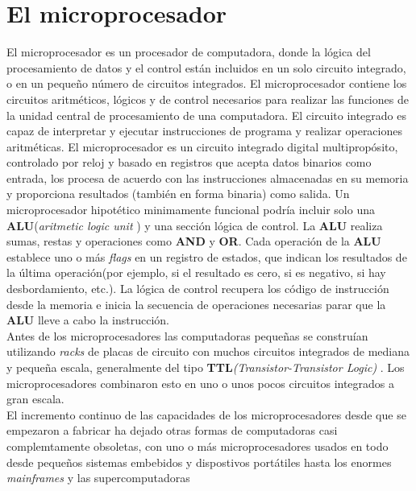 \chapter{El microprocesador}\label{chapter:microprocesador}


El microprocesador es un procesador de computadora, donde la lógica del procesamiento de datos y el control
están incluidos en un solo circuito integrado, o en un pequeño número de circuitos integrados.
El microprocesador contiene los circuitos aritméticos, lógicos y de control necesarios para realizar 
las funciones de la unidad central de procesamiento  de una computadora. El circuito integrado es capaz de interpretar y 
ejecutar instrucciones de programa y realizar operaciones aritméticas. 
El microprocesador es un circuito integrado digital multipropósito, controlado por reloj y basado en registros que 
acepta datos binarios como entrada, los procesa de acuerdo con las instrucciones almacenadas en su memoria y proporciona 
resultados (también en forma binaria) como salida. Un microprocesador hipotético minimamente funcional podría incluir
solo una \textbf{ALU}(\emph{aritmetic logic unit }) y una sección lógica de control. La \textbf{ALU} realiza sumas, restas 
y operaciones como \textbf{AND} y \textbf{OR}. Cada operación de la \textbf{ALU} establece uno o más \emph{flags} en un registro 
de estados, que indican los resultados de la última operación(por ejemplo, si el resultado es cero, si es negativo, si 
hay desbordamiento, etc.). La lógica de control recupera los código de instrucción desde la memoria e inicia la secuencia de
operaciones necesarias parar que la \textbf{ALU} lleve a cabo la instrucción.
\\ Antes de los microprocesadores las computadoras pequeñas se construían utilizando  \emph{racks} de placas de circuito con 
muchos circuitos integrados de mediana y pequeña escala, generalmente del tipo \textbf{TTL}\emph{(Transistor-Transistor Logic)} 
. Los microprocesadores combinaron esto en uno o unos pocos circuitos integrados a gran escala.\\
El incremento continuo de las capacidades de los microprocesadores desde  que 
se empezaron a fabricar ha dejado otras formas de computadoras casi complemtamente
obsoletas, con uno o más microprocesadores usados en todo desde pequeños sistemas 
embebidos  y dispostivos portátiles hasta los enormes \emph{mainframes} y las supercomputadoras

